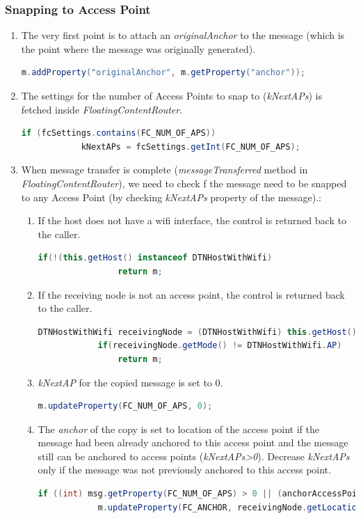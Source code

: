 \subsubsection{Snapping to Access Point}
\begin{enumerate}
	\item The very first point is to attach an \textit{originalAnchor} to the message (which is the point where the message was originally generated).		
	\begin{lstlisting}[language=java]
	m.addProperty("originalAnchor", m.getProperty("anchor"));
	\end{lstlisting}
	\item The settings for the number of Access Points to snap to (\textit{kNextAPs}) is fetched inside \textit{FloatingContentRouter}.
	\begin{lstlisting}[language=java]
		if (fcSettings.contains(FC_NUM_OF_APS))
			kNextAPs = fcSettings.getInt(FC_NUM_OF_APS);
	\end{lstlisting}
	\item When message transfer is complete (\textit{messageTransferred} method in \textit{FloatingContentRouter}), we need to check f the message need to be snapped to any Access Point (by checking \textit{kNextAPs} property of the message).:
	\begin{enumerate}
		\item If the host does not have a wifi interface, the control is returned back to the caller.
		\begin{lstlisting}[language=java]
			if(!(this.getHost() instanceof DTNHostWithWifi)
				return m;
			\end{lstlisting}
		\item If the receiving node is not an access point, the control is returned back to the caller.
		\begin{lstlisting}[language=java]
			DTNHostWithWifi receivingNode = (DTNHostWithWifi) this.getHost();
			if(receivingNode.getMode() != DTNHostWithWifi.AP)
				return m;
		\end{lstlisting}

		\item \textit{kNextAP} for the copied message is set to 0.
		\begin{lstlisting}[language=java]
			m.updateProperty(FC_NUM_OF_APS, 0);
		\end{lstlisting}

		\item The \textit{anchor} of the copy is set to location of the access point if the message had been already anchored to this access point and the message still can be anchored to access points (\textit{kNextAPs>0}). Decrease \textit{kNextAPs} only if the message was not previously anchored to this access point.
		\begin{lstlisting}[language=java]
		if ((int) msg.getProperty(FC_NUM_OF_APS) > 0 || (anchorAccessPoints != null && anchorAccessPoints.contains(receivingNode.toString()))) {
			m.updateProperty(FC_ANCHOR, receivingNode.getLocation().clone());


\end{lstlisting}
\end{enumerate}
\end{enumerate}
